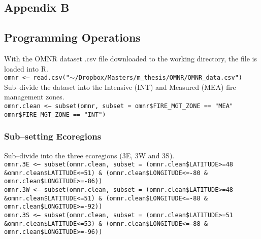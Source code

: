 \begin{spacing}{1.5}
\phantom
\phantom
\phantom
\phantom
\section{Appendix B}
\phantom
\phantom
\subsection{Programming Operations}
With the OMNR dataset .csv file downloaded to the working directory, the file is loaded into R.\\

\noindent \texttt{omnr <-- read.csv("$\sim$/Dropbox/Masters/m\_thesis/OMNR/OMNR\_data.csv")} \\

\noindent Sub--divide the dataset into the Intensive (INT) and Measured (MEA) fire management zones. \\

\noindent \texttt{omnr.clean <-- subset(omnr, subset = omnr\$FIRE\_MGT\_ZONE == "MEA" \textbar \linebreak omnr\$FIRE\_MGT\_ZONE == "INT")}

\subsubsection{Sub--setting Ecoregions}
Sub--divide into the three ecoregions (3E, 3W and 3S). \\

\noindent \texttt{omnr.3E <-- subset(omnr.clean, subset = (omnr.clean\$LATITUDE>=48 \&\linebreak omnr.clean\$LATITUDE<=51) \& (omnr.clean\$LONGITUDE<=-80 \& omnr.clean\$\linebreak LONGITUDE>=-86))} \\

\noindent \texttt{omnr.3W <-- subset(omnr.clean, subset = (omnr.clean\$LATITUDE>=48 \&\linebreak omnr.clean\$LATITUDE<=51) \& (omnr.clean\$LONGITUDE<=-88 \& omnr.clean\$\linebreak LONGITUDE>=-92)) }\\

\noindent \texttt{omnr.3S <-- subset(omnr.clean, subset = (omnr.clean\$LATITUDE>=51 \&\linebreak omnr.clean\$LATITUDE<=53) \& (omnr.clean\$LONGITUDE<=-88 \& omnr.clean\$\linebreak LONGITUDE>=-96)) }\\


\end{spacing}
